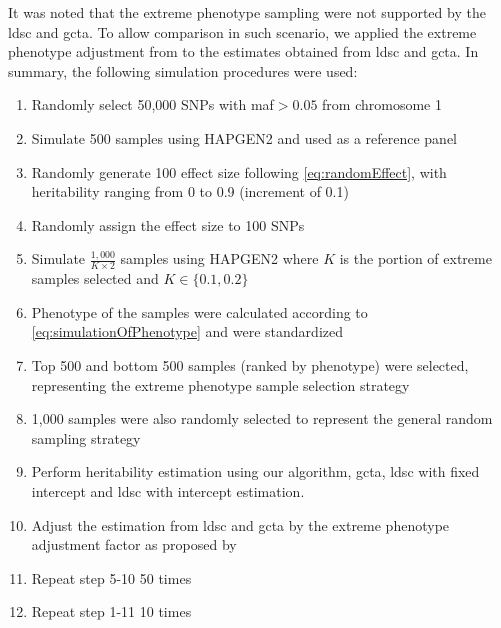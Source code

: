 		It was noted that the extreme phenotype sampling were not supported by the \gls{ldsc} and \gls{gcta}.
		To allow comparison in such scenario, we applied the extreme phenotype adjustment from \citet{Sham2014} to the estimates obtained from \gls{ldsc} and \gls{gcta}.
		In summary, the following simulation procedures were used:
		\begin{enumerate}
			\item Randomly select 50,000 \glspl{SNP} with \gls{maf}$>0.05$ from chromosome 1
			\item Simulate 500 samples using HAPGEN2 and used as a reference panel
			\item Randomly generate 100 effect size following \cref{eq:randomEffect}, with heritability ranging from 0 to 0.9 (increment of 0.1)
			\item Randomly assign the effect size to 100 \glspl{SNP}
			\item Simulate $\frac{1,000}{K\times2}$ samples using HAPGEN2 where $K$ is the portion of extreme samples selected and $K\in\{0.1,0.2\}$
			\item Phenotype of the samples were calculated according to \cref{eq:simulationOfPhenotype} and were standardized
			\item Top 500 and bottom 500 samples (ranked by phenotype) were selected, representing the extreme phenotype sample selection strategy
			\item 1,000 samples were also randomly selected to represent the general random sampling strategy
			\item Perform heritability estimation using our algorithm, \gls{gcta}, \gls{ldsc} with fixed intercept and \gls{ldsc} with intercept estimation.
			\item Adjust the estimation from \gls{ldsc} and \gls{gcta} by the extreme phenotype adjustment factor as proposed by \citet{Sham2014}
			\item Repeat step 5-10 50 times
			\item Repeat step 1-11 10 times
		\end{enumerate}
		
		
	
